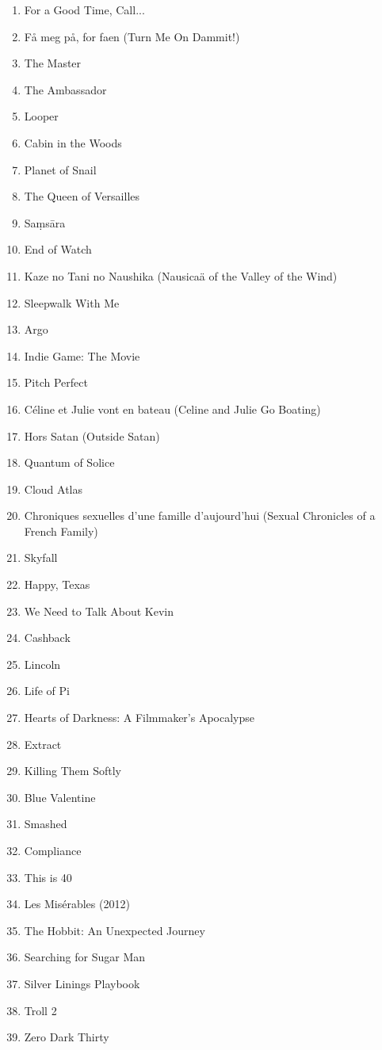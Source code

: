 \documentclass[11pt]{article}
\begin{document}
\begin{enumerate}
\item For a Good Time, Call...
\item Få meg på, for faen (Turn Me On Dammit!)
\item The Master
\item The Ambassador
\item Looper
\item Cabin in the Woods
\item Planet of Snail
\item The Queen of Versailles
\item Saṃsāra
\item End of Watch
\item Kaze no Tani no Naushika (Nausicaä of the Valley of the Wind)
\item Sleepwalk With Me
\item Argo
\item Indie Game: The Movie
\item Pitch Perfect
\item Céline et Julie vont en bateau (Celine and Julie Go Boating)
\item Hors Satan (Outside Satan)
\item Quantum of Solice
\item Cloud Atlas
\item Chroniques sexuelles d'une famille d'aujourd'hui (Sexual Chronicles of a French Family)
\item Skyfall
\item Happy, Texas
\item We Need to Talk About Kevin
\item Cashback
\item Lincoln
\item Life of Pi
\item Hearts of Darkness: A Filmmaker's Apocalypse
\item Extract
\item Killing Them Softly
\item Blue Valentine
\item Smashed
\item Compliance
\item This is 40
\item Les Misérables (2012)
\item The Hobbit: An Unexpected Journey
\item Searching for Sugar Man
\item Silver Linings Playbook
\item Troll 2
\item Zero Dark Thirty

\end{enumerate}
\end{document}
